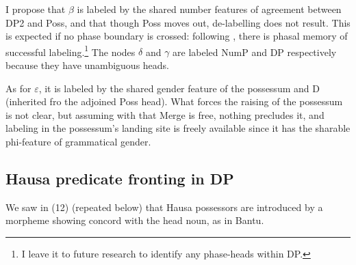 \documentclass[output=paper
,modfonts
,nonflat]{langsci/langscibook}
\begin{document}
\begin{figure}[!h]
	\begin{exe}
	\end{exe}
\end{figure}
\noindent I propose that $\beta$ is labeled by the shared number features of agreement between DP2 and Poss, and that though Poss moves out, de-labelling does not result. This is expected if no phase boundary is crossed: following \citet[11]{Chomsky2015}, there is phasal memory of successful labeling.\footnote{I leave it to future research to identify any phase-heads within DP.}  The nodes $\delta$ and $\gamma$ are labeled NumP and DP respectively because they have unambiguous heads. 

As for $\varepsilon$, it is labeled by the shared gender feature of the possessum and D (inherited fro the adjoined Poss head). What forces the raising of the possessum is not clear, but assuming with \citealt{Chomsky2015} that Merge is free, nothing precludes it, and labeling in the possessum’s landing site is freely available since it has the sharable phi-feature of grammatical gender. 

\subsection{Hausa predicate fronting in DP}
We saw in (12) (repeated below) that Hausa possessors are introduced by a morpheme showing concord with the head noun, as in Bantu. 
\end{document}
